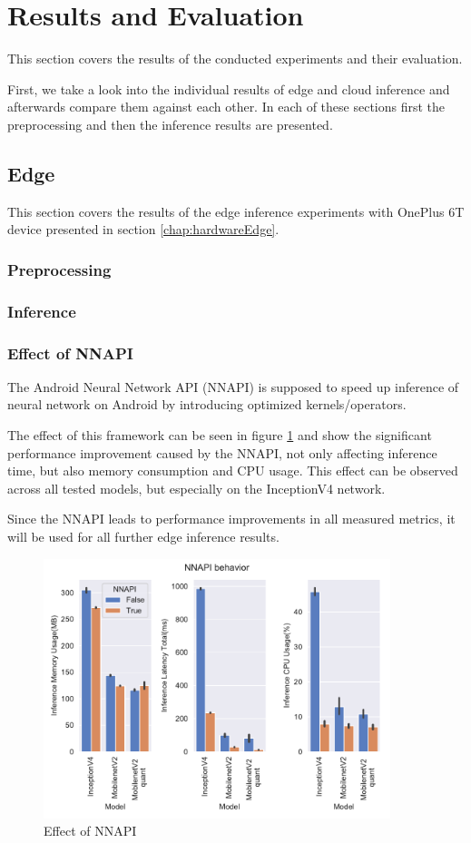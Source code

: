 \section{Results and Evaluation}
This section covers the results of the conducted experiments and their evaluation.

First, we take a look into the individual results of edge and cloud inference and afterwards compare them against each other. In each of these sections first the preprocessing and then the inference results are presented.
\subsection{Edge}
This section covers the results of the edge inference experiments with OnePlus 6T device presented in section \ref{chap:hardwareEdge}.
\subsubsection{Preprocessing}
\subsubsection{Inference}
\subsubsection{Effect of NNAPI}
The Android Neural Network API (NNAPI) is supposed to speed up inference of neural network on Android by introducing optimized kernels/operators. 

The effect of this framework can be seen in figure \ref{fig:NNAPI} and show the significant performance improvement caused by the NNAPI, not only affecting inference time, but also memory consumption and CPU usage.
This effect can be observed across all tested models, but especially on the InceptionV4 network.


Since the NNAPI leads to performance improvements in all measured metrics, it will be used for all further edge inference results.
\begin{figure}[H]
\centering
\includegraphics[width=0.9\textwidth]{./Bilder/single_plots/edge_inference_plots/NNAPI_behavior.pdf}
\caption{Effect of NNAPI}
\label{fig:NNAPI}
\end{figure}
